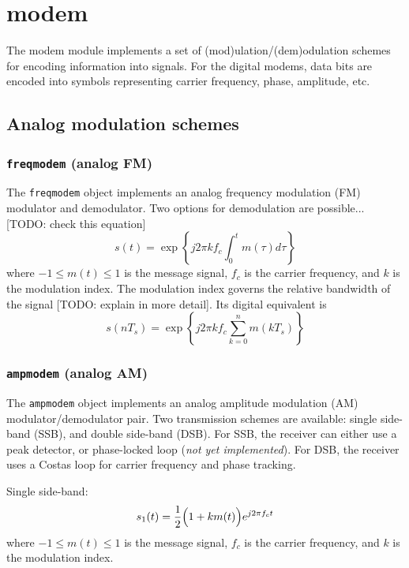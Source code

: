 % 
%

\newpage
\section{modem}
\label{module:modem}
The modem module implements a set of (mod)ulation/(dem)odulation schemes
for encoding information into signals.
For the digital modems, data bits are encoded into symbols representing
carrier frequency, phase, amplitude, etc.

\subsection{Analog modulation schemes}
\subsubsection{{\tt freqmodem} (analog FM)}
The {\tt freqmodem} object implements an analog frequency modulation (FM)
modulator and demodulator.
Two options for demodulation are possible...
[TODO: check this equation]
\[
    s(t) =  \exp\left\{
                j 2 \pi k f_c
                \int_{0}^{t}{
                    m(\tau)d\tau
                }
            \right\}
\]
where $-1 \le m(t) \le 1$ is the message signal, $f_c$ is the carrier
frequency, and $k$ is the modulation index.
The modulation index governs the relative bandwidth of the signal
[TODO: explain in more detail].
Its digital equivalent is
\[
    s(nT_s) =   \exp\left\{
                    j 2 \pi k f_c
                    \sum_{k=0}^{n}{
                        m(kT_s)
                    }
                \right\}
\]

\subsubsection{{\tt ampmodem} (analog AM)}
The {\tt ampmodem} object implements an analog amplitude modulation (AM)
modulator/demodulator pair.
Two transmission schemes are available: single side-band (SSB), and
double side-band (DSB).
For SSB, the receiver can either use a peak detector, or phase-locked loop
({\it not yet implemented}).
For DSB, the receiver uses a Costas loop for carrier frequency and phase
tracking.

Single side-band:
\[
    s_1(t) = \frac{1}{2}\Bigl(1+k m(t)\Bigr)e^{j 2 \pi f_c t}
\]
where $-1 \le m(t) \le 1$ is the message signal, $f_c$ is the carrier frequency,
and $k$ is the modulation index.

